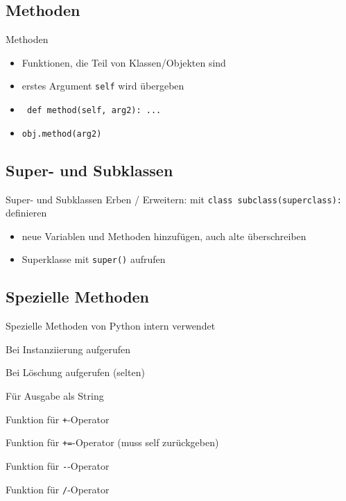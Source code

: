 \subsection{Methoden}
\begin{frame}{Methoden}
	\begin{itemize}
		\item Funktionen, die Teil von Klassen/Objekten sind
		\item<2-> erstes Argument \texttt{self} wird übergeben
		\item<3-> \texttt{	def method(self, arg2): ...}
		\item<3-> \texttt{obj.method(arg2)}
	\end{itemize}
\end{frame}

\subsection{Super- und Subklassen}
\begin{frame}{Super- und Subklassen}
	Erben / Erweitern: mit \alert{\tt class subclass(superclass):} definieren
	\begin{itemize}
		\item neue Variablen und Methoden hinzufügen, auch alte überschreiben
		\item Superklasse mit \alert{\tt super()} aufrufen
	\end{itemize}
	
\end{frame}
\subsection{Spezielle Methoden}
\begin{frame}{Spezielle Methoden}
	von Python intern verwendet

	\begin{description}
		\item<1->[\tt\_\_init\_\_] Bei Instanziierung aufgerufen
		\item<2->[\tt\_\_del\_\_] Bei Löschung aufgerufen (selten)
		\item<3->[\tt\_\_str\_\_] Für Ausgabe als String
		\item<4->[\tt\_\_add\_\_] Funktion für \alert{\tt +}-Operator
		\item<5->[\tt\_\_iadd\_\_] Funktion für \alert{\tt +=}-Operator (muss self zurückgeben)
		\item<6->[\tt\_\_sub\_\_] Funktion für \alert{\tt -}-Operator
		\item<7->[\tt\_\_truediv\_\_] Funktion für \alert{\tt /}-Operator
	\end{description}
\end{frame}



